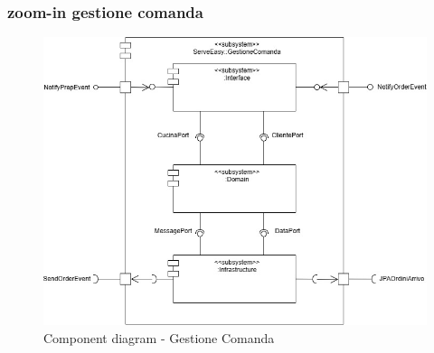 \subsubsection{zoom-in gestione comanda}
\begin{figure}[H]
	\centering
	\includegraphics[scale=0.5]{iterazione1/images/component_comanda_cucina-GestioneComanda.jpg}
	\caption{Component diagram - Gestione Comanda\label{fig:component_diagram_gestione_comanda}}
\end{figure}


